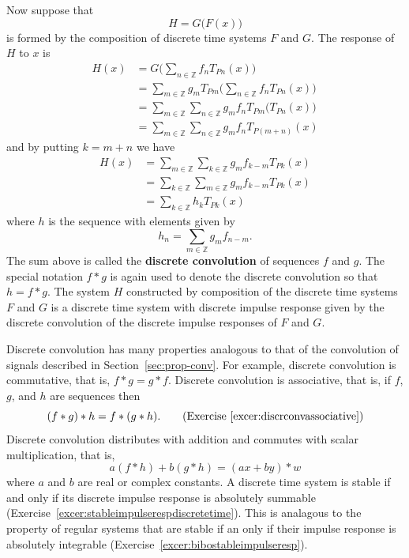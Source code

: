 \documentclass[11pt,a4paper]{book}
\theoremstyle{plain}
\numberwithin{equation}{section}
\newcommand{\ints}{{\mathbb Z}}
\newcommand{\term}{\textbf}
\begin{document}
Now suppose that
\[
H = G\big( F(x) \big) 
\]
is formed by the composition of discrete time systems $F$ and $G$.  The response of $H$ to $x$ is %
\begin{align*}
H(x) &= G \big( \sum_{n \in \ints} f_n T_{ P n}(x)  \big) \\
&= \sum_{m \in \ints} g_m T_{Pm} \big( \sum_{n \in \ints} f_n T_{ P n}(x)  \big) \\
&= \sum_{m \in \ints} \sum_{n \in \ints} g_m f_n T_{Pm}\big( T_{Pn}(x)  \big) \\
&= \sum_{m \in \ints} \sum_{n \in \ints} g_m f_n T_{P(m+n)}(x) 
\end{align*}
and by putting $k = m+n$ we have
\begin{align*}
H(x) &= \sum_{m \in \ints} \sum_{k \in \ints} g_m f_{k-m} T_{Pk}(x) \\
&=  \sum_{k \in \ints} \sum_{m \in \ints} g_m f_{k-m} T_{Pk}(x) \\
&= \sum_{k \in \ints} h_k T_{Pk}(x)
\end{align*}
where $h$ is the sequence with elements given by
\[
h_n = \sum_{m \in \ints} g_m f_{n-m}.
\]
The sum above is called the \term{discrete convolution} of sequences $f$ and $g$.  The special notation $f * g$ is again used to denote the discrete convolution so that $h = f * g$.  The system $H$ constructed by composition of the discrete time systems $F$ and $G$ is a discrete time system with discrete impulse response given by the discrete convolution of the discrete impulse responses of $F$ and $G$.

Discrete convolution has many properties analogous to that of the convolution of signals described in Section~\ref{sec:prop-conv}.  For example, discrete convolution is commutative, that is, $f * g = g * f$.  Discrete convolution is associative, that is, if $f$, $g$, and $h$ are sequences then
\[
(f*g)*h = f*(g*h). \qquad \text{(Exercise~\ref{excer:discrconvassociative})}
\] 
Discrete convolution distributes with addition and commutes with scalar multiplication, that is,
\[
a (f * h) + b (g * h) = (ax + by) * w
\]
where $a$ and $b$ are real or complex constants.  A discrete time system is stable if and only if its discrete impulse response is absolutely summable (Exercise~\ref{excer:stableimpulserespdiscretetime}).  This is analagous to the property of regular systems that are stable if an only if their impulse response is absolutely integrable (Exercise~\ref{excer:bibostableimpulseresp}).
\end{document}
